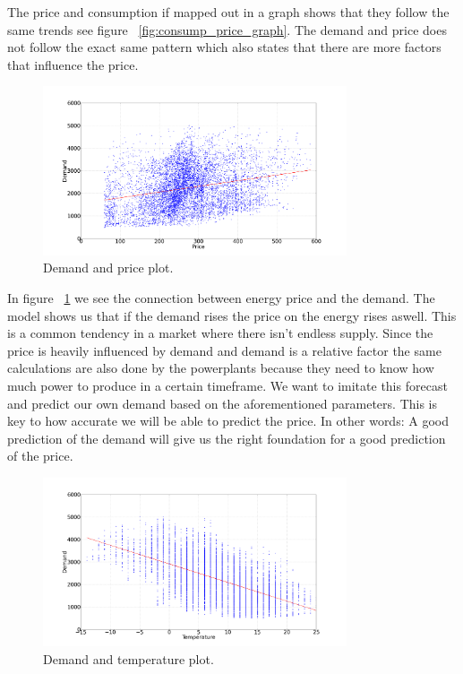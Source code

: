 The price and consumption if mapped out in a graph shows that they follow the same trends see figure ~\ref{fig:consump_price_graph}. The demand and price does not follow the exact same pattern which also states that there are more factors that influence the price.

\begin{figure}[H]
\centering
\includegraphics[width=0.8\textwidth ]{billeder/energy_price_plots/consump_price.png}
\caption{Demand and price plot.}
\label{fig:consump_price}
\end{figure}

In figure ~\ref{fig:consump_price} we see the connection between energy price and the demand. The model shows us that if the demand rises the price on the energy rises aswell. This is a common tendency in a market where there isn't endless supply. Since the price is heavily influenced by demand and demand is a relative factor the same calculations are also done by the powerplants because they need to know how much power to produce in a certain timeframe. We want to imitate this forecast and predict our own demand based on the aforementioned parameters. This is key to how accurate we will be able to predict the price. In other words: A good prediction of the demand will give us the right foundation for a good prediction of the price.

\begin{figure}[H]
\centering
\includegraphics[width=0.8\textwidth ]{billeder/energy_price_plots/consump_temp.png}
\caption{Demand and temperature plot.}
\label{fig:consump_temp}
\end{figure}

